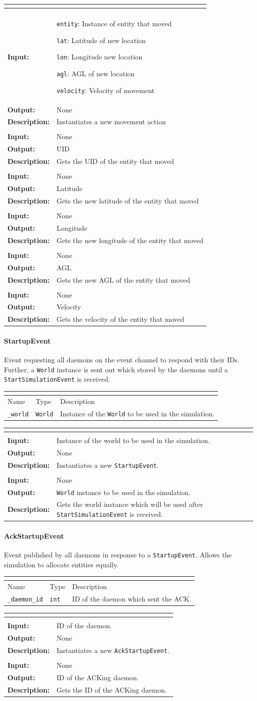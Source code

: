 \documentclass[titlepage]{article}
\renewenvironment{itemize*}
    {\begin{itemize}
        \setlength{\itemsep}{0pt}%
        \setlength{\parskip}{0pt}%
        \setlength{\partopsep}{0pt}%
        \setlength{\topsep}{0pt}}%
    {\end{itemize}}
\newcommand{\operations}[1]{
\begin{center}
    \begin{longtable}{|p{4cm}|p{10cm + 2.0\tabcolsep}|}
    \hline
    \multicolumn{2}{|l|}{\cellcolor[gray]{0.5}{\textbf{Operations}}} \\ \hline
#1
    \end{longtable}
\end{center}
}
\newcommand{\operation}[4]{
    \hline
    \multicolumn{2}{|l|}{\cellcolor[gray]{0.8}{\texttt{#1}}} \\ \hline
    \hspace{7pt}\textbf{Input:} & #2 \\ \hline
    \hspace{7pt}\textbf{Output:} & #3 \\ \hline
    \hspace{7pt}\textbf{Description:} & #4 \\ \hline
}
\newcommand{\attributes}[1]{
    \begin{center}
        \begin{tabular}{|p{3cm}|p{3cm}|p{8cm}|}
            \multicolumn{3}{|l|}{\cellcolor[gray]{0.5}{\textbf{Attributes}}} \\ \hline
            \rowcolor[gray]{0.8} Name & Type & Description \\ \hline 
            #1
        \end{tabular}
    \end{center}
}
\newcommand{\attribute}[3]{
    \texttt{#1} & \texttt{#2} & #3 \\ \hline
}
\begin{document}
\operations
{
    \operation{\_\_init\_\_(entity, lat, lon, agl, velocity)}
    {
        \begin{itemize*}
            \item \texttt{entity}: Instance of entity that moved
            \item \texttt{lat}: Latitude of new location
            \item \texttt{lon}: Longitude new location
            \item \texttt{agl}: AGL of new location
            \item \texttt{velocity}: Velocity of movement
        \end{itemize*}
    }{None}{Instantiates a new movement action}
    \operation{get\_uid()}{None}{UID}{Gets the UID of the entity that moved}
    \operation{get\_lat()}{None}{Latitude}{Gets the new latitude of the entity that moved}
    \operation{get\_lon()}{None}{Longitude}{Gets the new longitude of the entity that moved}
    \operation{get\_agl()}{None}{AGL}{Gets the new AGL of the entity that moved}
    \operation{get\_velocity()}{None}{Velocity}{Gets the velocity of the entity that moved}
}

\paragraph{StartupEvent}{Event requesting all daemons on the event channel to respond with their IDs.  Further, a \texttt{World} instance is sent out which stored by the daemons until a \texttt{StartSimulationEvent} is received.}
\attributes
{
    \attribute{\_world}{World}{Instance of the \texttt{World} to be used in the simulation.}
}

\operations
{
    \operation{\_\_init\_\_(world)}{Instance of the world to be used in the simulation.}{None}{Instantiates a new \texttt{StartupEvent}.}
    \operation{get\_world()}{None}{\texttt{World} instance to be used in the simulation.}{Gets the world instance which will be used after \texttt{StartSimulationEvent} is received.}
}

\paragraph{AckStartupEvent}{Event published by all daemons in response to a \texttt{StartupEvent}.  Allows the simulation to allocate entities equally.}
\attributes
{
    \attribute{\_daemon\_id}{int}{ID of the daemon which sent the ACK.}
}

\operations
{
    \operation{\_\_init\_\_(daemon\_id)}{ID of the daemon.}{None}{Instantiates a new \texttt{AckStartupEvent}.}
    \operation{get\_daemon\_id()}{None}{ID of the ACKing daemon.}{Gets the ID of the ACKing daemon.}
}
\end{document}
